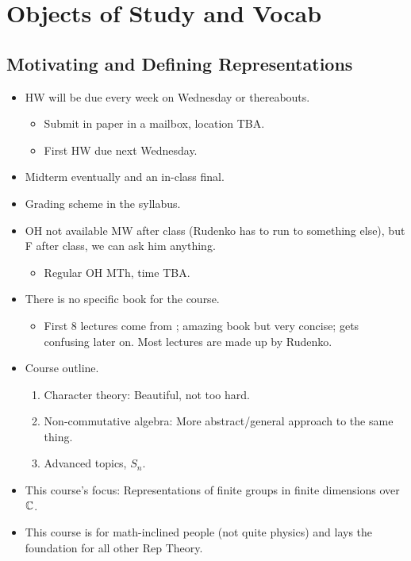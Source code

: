 \documentclass[../notes.tex]{subfiles}
\begin{document}
\chapter{Objects of Study and Vocab}
\section{Motivating and Defining Representations}
\begin{itemize}
    \item {}HW will be due every week on Wednesday or thereabouts.
    \begin{itemize}
        \item Submit in paper in a mailbox, location TBA.
        \item First HW due next Wednesday.
    \end{itemize}
    \item Midterm eventually and an in-class final.
    \item Grading scheme in the syllabus.
    \item OH not available MW after class (Rudenko has to run to something else), but F after class, we can ask him anything.
    \begin{itemize}
        \item Regular OH MTh, time TBA.
    \end{itemize}
    \item There is no specific book for the course.
    \begin{itemize}
        \item First 8 lectures come from \textcite{bib:Serre}; amazing book but very concise; gets confusing later on. Most lectures are made up by Rudenko.
    \end{itemize}
    \item Course outline.
    \begin{enumerate}
        \item Character theory: Beautiful, not too hard.
        \item Non-commutative algebra: More abstract/general approach to the same thing.
        \item Advanced topics, $S_n$.
    \end{enumerate}
    \item This course's focus: Representations of finite groups in finite dimensions over $\mathbb{C}$.
    \item This course is for math-inclined people (not quite physics) and lays the foundation for all other Rep Theory.

\end{itemize}
\end{document}
